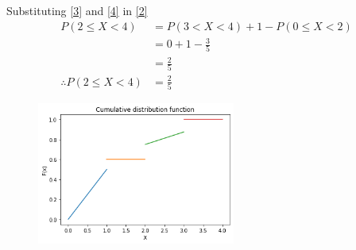 \documentclass[journal,12pt,twocolumn]{IEEEtran}
\begin{document}
Substituting \eqref{3} and \eqref{4} in \eqref{2}
\begin{align}
P(2 \leq X <4) &=  P(3<X<4) + 1  - P(0 \leq X <2)\\
&= 0+1- \frac{3}{5}\\
&=\frac{2}{5}\\
\therefore P(2 \leq X <4) &= \frac{2}{5}
\end{align}




\begin{figure}[htb!]
\includegraphics[width=0.58\textwidth]{assignment2.png}
\end{figure}
\end{document}
